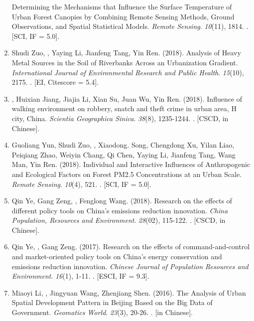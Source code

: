 \begin{enumerate}
    Determining the Mechanisms that Influence the Surface Temperature of Urban Forest Canopies by Combining Remote Sensing Methods, Ground Observations, and Spatial Statistical Models. 
    \textit{Remote Sensing}. \textit{10}(11), 1814.
    . [SCI, IF = 5.0].
\item
    Shudi Zuo, \Shaoqing, Yaying Li, Jianfeng Tang, Yin Ren. (2018).
	Analysis of Heavy Metal Sources in the Soil of Riverbanks Across an Urbanization Gradient.
    \textit{International Journal of Environmental Research and Public Health}. \textit{15}(10), 2175.
    . [EI, Citescore = 5.4].
\item
    \Shaoqing, Huixian Jiang, Jiajia Li, Xian Su, Juan Wu, Yin Ren. (2018).
	Influence of walking environment on robbery, snatch and theft crime in urban area, H city, China.
    \textit{Scientia Geographica Sinica}.  \textit{38}(8), 1235-1244.
    . [CSCD, in Chinese].
\item
    Guoliang Yun, Shudi Zuo, \Shaoqing, Xiaodong. Song, Chengdong Xu, Yilan Liao, Peiqiang Zhao, Weiyin Chang, Qi Chen, Yaying Li, Jianfeng Tang, Wang Man, Yin Ren. (2018).
	Individual and Interactive Influences of Anthropogenic and Ecological Factors on Forest PM2.5 Concentrations at an Urban Scale.
    \textit{Remote Sensing}. \textit{10}(4), 521.
    . [SCI, IF = 5.0].
\item
    Qin Ye, Gang Zeng, \Shaoqing, Fenglong Wang. (2018).
	Research on the effects of different policy tools on China’s emissions reduction innovation.
    \textit{China Population, Resources and Environment}. \textit{28}(02), 115-122.
    . [CSCD, in Chinese].
\item
    Qin Ye, \Shaoqing, Gang Zeng. (2017).
	Research on the effects of command-and-control and market-oriented policy tools on China’s energy conservation and emissions reduction innovation.
    \textit{Chinese Journal of Population Resources and Environment}. \textit{16}(1), 1-11.
    . [ESCI, IF = 9.3].
\item
    Miaoyi Li, \Shaoqing, Jingyuan Wang, Zhenjiang Shen. (2016).
	The Analysis of Urban Spatial Development Pattern in Beijing Based on the Big Data of Government.
    \textit{Geomatics World}. \textit{23}(3), 20-26.
    . [in Chinese].
\end{enumerate}

